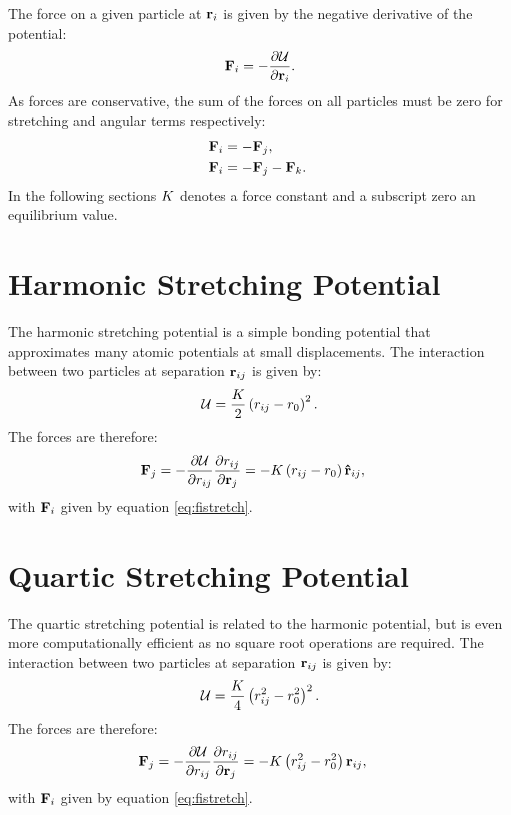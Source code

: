 The force on a given particle at $\mathbf{r}_i$ is given by the negative derivative of the potential:
\begin{equation}
	\mathbf{F}_i=-\frac{\partial \mathcal{U}}{\partial \mathbf{r}_i}.
\end{equation}
As forces are conservative, the sum of the forces on all particles must be zero \ie{} for stretching and angular terms respectively:
\begin{align}
	\mathbf{F}_i &= -\mathbf{F}_j, \label{eq:fistretch}\\
	\mathbf{F}_i &= -\mathbf{F}_j -\mathbf{F}_k. \label{eq:fiangle}\
\end{align}
In the following sections $K$ denotes a force constant and a subscript zero an equilibrium value.

\section{Harmonic Stretching Potential}

The harmonic stretching potential is a simple bonding potential that approximates many atomic potentials at small displacements.
The interaction between two particles at separation $\mathbf{r}_{ij}$ is given by:
\begin{equation}
	\mathcal{U} = \frac{K}{2}\left(r_{ij}-r_0\right)^2.
\end{equation}
The forces are therefore:
\begin{align}
	\mathbf{F}_j&=-\frac{\partial \mathcal{U}}{\partial r_{ij}} \frac{\partial r_{ij}}{\partial \mathbf{r}_j} = -K\left(r_{ij}-r_0\right)\boldsymbol{\hat{\mathbf{r}}}_{ij},
\end{align}
with $\mathbf{F}_i$ given by equation \eqref{eq:fistretch}.

\section{Quartic Stretching Potential}

The quartic stretching potential is related to the harmonic potential, but is even more computationally efficient as no square root operations are required.
The interaction between two particles at separation $\mathbf{r}_{ij}$ is given by:
\begin{equation}
	\mathcal{U} = \frac{K}{4}\left(r_{ij}^2-r_0^2\right)^2.
\end{equation}
The forces are therefore:
\begin{align}
	\mathbf{F}_j&=-\frac{\partial \mathcal{U}}{\partial r_{ij}} \frac{\partial r_{ij}}{\partial \mathbf{r}_j} = -K\left(r_{ij}^2-r_0^2\right)\mathbf{r}_{ij},
\end{align}
with $\mathbf{F}_i$ given by equation \eqref{eq:fistretch}.

